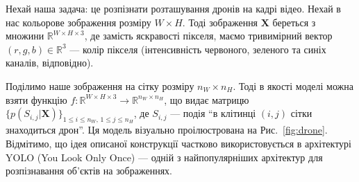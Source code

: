 \begin{example}
	Нехай наша задача: це розпізнати розташування дронів на кадрі відео. Нехай в
	нас кольорове зображення розміру $W \times H$. Тоді зображення
	$\boldsymbol{X}$ береться з множини $\mathbb{R}^{W \times H \times 3}$,
	де замість яскравості пікселя, маємо тривимірний вектор $(r,g,b) \in
	\mathbb{R}^3$ --- колір пікселя (інтенсивність червоного, зеленого та синіх
	каналів, відповідно).

	Поділимо наше зображення на сітку розміру $n_W \times n_H$. Тоді в якості
	моделі можна взяти функцію $f: \mathbb{R}^{W \times H \times 3} \to
	\mathbb{R}^{n_W \times n_H}$, що видає матрицю
	$\{p(S_{i,j}|\boldsymbol{X})\}_{1 \leq i \leq n_W, \, 1 \leq j \leq n_H}$,
	де $S_{i,j}$ --- подія ``в клітинці $(i,j)$ сітки знаходиться дрон''. Ця
	модель візуально проілюстрована на Рис.~\ref{fig:drone}. Відмітимо, що ідея
	описаної конструкції частково використовується в архітектурі YOLO (You Look
	Only Once) \cite{yolo} --- одній з найпопулярніших архітектур для
	розпізнавання об'єктів на зображеннях.

	\begin{figure}
	
	\centering
\end{figure}
\end{example}
